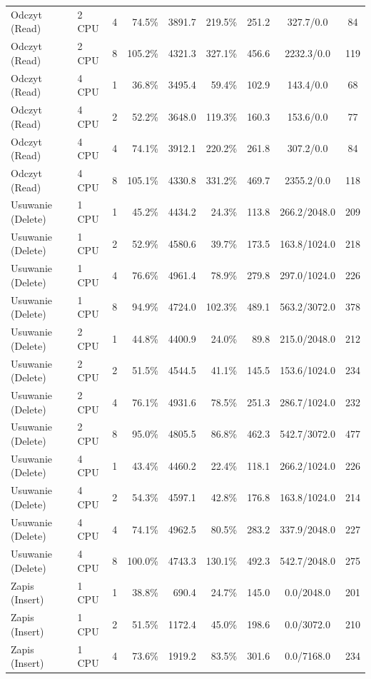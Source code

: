 \begin{table}[ht]
{\begin{tabular}{llcrrrrcc}
Odczyt (Read) & 2 CPU & 4 & 74.5\% & 3891.7 & 219.5\% & 251.2 & 327.7/0.0 & 84 \\
Odczyt (Read) & 2 CPU & 8 & 105.2\% & 4321.3 & 327.1\% & 456.6 & 2232.3/0.0 & 119 \\
Odczyt (Read) & 4 CPU & 1 & 36.8\% & 3495.4 & 59.4\% & 102.9 & 143.4/0.0 & 68 \\
Odczyt (Read) & 4 CPU & 2 & 52.2\% & 3648.0 & 119.3\% & 160.3 & 153.6/0.0 & 77 \\
Odczyt (Read) & 4 CPU & 4 & 74.1\% & 3912.1 & 220.2\% & 261.8 & 307.2/0.0 & 84 \\
Odczyt (Read) & 4 CPU & 8 & 105.1\% & 4330.8 & 331.2\% & 469.7 & 2355.2/0.0 & 118 \\
Usuwanie (Delete) & 1 CPU & 1 & 45.2\% & 4434.2 & 24.3\% & 113.8 & 266.2/2048.0 & 209 \\
Usuwanie (Delete) & 1 CPU & 2 & 52.9\% & 4580.6 & 39.7\% & 173.5 & 163.8/1024.0 & 218 \\
Usuwanie (Delete) & 1 CPU & 4 & 76.6\% & 4961.4 & 78.9\% & 279.8 & 297.0/1024.0 & 226 \\
Usuwanie (Delete) & 1 CPU & 8 & 94.9\% & 4724.0 & 102.3\% & 489.1 & 563.2/3072.0 & 378 \\
Usuwanie (Delete) & 2 CPU & 1 & 44.8\% & 4400.9 & 24.0\% & 89.8 & 215.0/2048.0 & 212 \\
Usuwanie (Delete) & 2 CPU & 2 & 51.5\% & 4544.5 & 41.1\% & 145.5 & 153.6/1024.0 & 234 \\
Usuwanie (Delete) & 2 CPU & 4 & 76.1\% & 4931.6 & 78.5\% & 251.3 & 286.7/1024.0 & 232 \\
Usuwanie (Delete) & 2 CPU & 8 & 95.0\% & 4805.5 & 86.8\% & 462.3 & 542.7/3072.0 & 477 \\
Usuwanie (Delete) & 4 CPU & 1 & 43.4\% & 4460.2 & 22.4\% & 118.1 & 266.2/1024.0 & 226 \\
Usuwanie (Delete) & 4 CPU & 2 & 54.3\% & 4597.1 & 42.8\% & 176.8 & 163.8/1024.0 & 214 \\
Usuwanie (Delete) & 4 CPU & 4 & 74.1\% & 4962.5 & 80.5\% & 283.2 & 337.9/2048.0 & 227 \\
Usuwanie (Delete) & 4 CPU & 8 & 100.0\% & 4743.3 & 130.1\% & 492.3 & 542.7/2048.0 & 275 \\
Zapis (Insert) & 1 CPU & 1 & 38.8\% & 690.4 & 24.7\% & 145.0 & 0.0/2048.0 & 201 \\
Zapis (Insert) & 1 CPU & 2 & 51.5\% & 1172.4 & 45.0\% & 198.6 & 0.0/3072.0 & 210 \\
Zapis (Insert) & 1 CPU & 4 & 73.6\% & 1919.2 & 83.5\% & 301.6 & 0.0/7168.0 & 234 \\

\end{tabular}}
\end{table}
